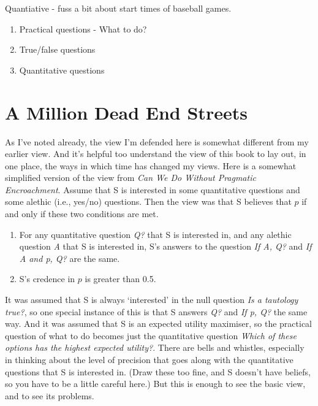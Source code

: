 \documentclass[11pt,]{book}
\providecommand{\tightlist}{%
  \setlength{\itemsep}{0pt}\setlength{\parskip}{0pt}}
\begin{document}
Quantiative - fuss a bit about start times of baseball games.

\begin{enumerate}
\def\labelenumi{\arabic{enumi}.}
\tightlist
\item
  Practical questions - What to do?
\item
  True/false questions
\item
  Quantitative questions
\end{enumerate}

\hypertarget{changes}{%
\section{A Million Dead End Streets}\label{changes}}

As I've noted already, the view I'm defended here is somewhat different from my earlier view. And it's helpful too understand the view of this book to lay out, in one place, the ways in which time has changed my views. Here is a somewhat simplified version of the view from \emph{Can We Do Without Pragmatic Encroachment}. Assume that S is interested in some quantitative questions and some alethic (i.e., yes/no) questions. Then the view was that S believes that \(p\) if and only if these two conditions are met.

\begin{enumerate}
\def\labelenumi{\arabic{enumi}.}
\tightlist
\item
  For any quantitative question \emph{Q?} that S is interested in, and any alethic question \emph{A} that S is interested in, S's answers to the question \emph{If A, Q?} and \emph{If A and p, Q?} are the same.
\item
  S's credence in \(p\) is greater than 0.5.
\end{enumerate}

It was assumed that S is always `interested' in the null question \emph{Is a tautology true?}, so one special instance of this is that S answers \emph{Q?} and \emph{If p, Q?} the same way. And it was assumed that S is an expected utility maximiser, so the practical question of what to do becomes just the quantitative question \emph{Which of these options has the highest expected utility?}. There are bells and whistles, especially in thinking about the level of precision that goes along with the quantitative questions that S is interested in. (Draw these too fine, and S doesn't have beliefs, so you have to be a little careful here.) But this is enough to see the basic view, and to see its problems.
\end{document}
